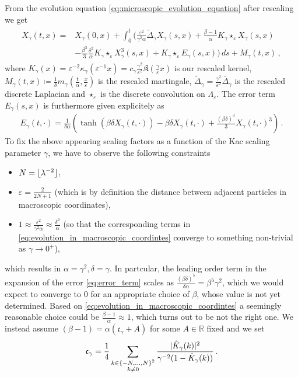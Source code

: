 \documentclass{report}
\newcommand{\RR}{\mathbb{R}}
\DeclarePairedDelimiter\abs{\lvert}{\rvert} %
\DeclarePairedDelimiter\floor{\lfloor}{\rfloor}
\newcommand{\Convolve}[3][]{#2 \star_{#1} #3}
\DeclareMathOperator{\DefiningEquality}{\coloneqq}
\theoremstyle{remark}
\theoremstyle{definition}
\let\epsilon\varepsilon
\begin{document}
From the evolution equation \eqref{eq:microscopic_evolution_equation} after rescaling we get
\begin{align}
  \label{eq:evolution_in_macroscopic_coordintes}
  \begin{split}
      X_\gamma(t, x) =& X_\gamma(0, x) + \int_{0}^{t} \biggl(\frac{\epsilon^2}{\gamma^2 \alpha}\tilde{\Delta}_\gamma X_\gamma(s, x) + \frac{\beta - 1}{\alpha} \Convolve[\epsilon]{K_\gamma}{X_\gamma(s, x)}\\
    &-\frac{\beta^3}{3} \frac{\delta^2}{\alpha} \Convolve[\epsilon]{K_\gamma}{X_\gamma^3(s, x)} + \Convolve[\epsilon]{K_\gamma}{E_\gamma(s, x)}\biggr)\,ds + M_\gamma(t, x)\,,
  \end{split}
\end{align}
where $K_\gamma(x) = \epsilon^{-2} \kappa_\gamma(\epsilon^{-1}x) = c_\gamma \frac{\gamma^2}{\epsilon^2}\mathfrak{K}\left(\frac{\gamma}{\epsilon}x\right)$ is our rescaled kernel, $M_\gamma(t, x) \DefiningEquality \frac{1}{\delta}m_\gamma\left(\frac{t}{\alpha},\frac{x}{\epsilon}\right)$ is the rescaled martingale, $\tilde{\Delta}_\gamma = \frac{\gamma^2}{\epsilon^2} \bar{\Delta}_\gamma$ is the rescaled discrete Laplacian and $\Convolve[\epsilon]{}{}$ is the discrete convolution on $\Lambda_\epsilon$. The error term $E_\gamma(s, x)$ is furthermore given explicitely as 
\begin{align}
  \label{eq:error_term}
  E_\gamma(t, \cdot) = \frac{1}{\delta \alpha}\left(\tanh\left(\beta \delta X_\gamma(t, \cdot)\right) - \beta \delta X_\gamma(t, \cdot) + \frac{(\beta \delta)^3}{3} X_\gamma(t, \cdot)^3\right)\,.
\end{align}
To fix the above appearing scaling factors as a function of the Kac scaling parameter $\gamma$, we have to observe the following constraints 
\begin{itemize}
  \item $N = \floor{\lambda^{-2}}$,
  \item  $\epsilon = \frac{2}{2N + 1}$ (which is by definition the distance between adjacent particles in macroscopic coordinates),
  \item $1 \approx \frac{\epsilon^2}{\gamma^2 \alpha} \approx \frac{\delta^2}{\alpha}$ (so that the corresponding terms in \eqref{eq:evolution_in_macroscopic_coordintes} converge to something non-trivial as $\gamma \to 0^+$),
\end{itemize}
which results in $\alpha = \gamma^2, \delta=\gamma$. In partcular, the leading order term in the expansion of the error \eqref{eq:error_term} scales as $\frac{(\beta \delta)^5}{\delta\alpha} = \beta^5 \gamma^2$, which we would expect to converge to $0$ for an appropriate choice of $\beta$, whose value is not yet determined. Based on \eqref{eq:evolution_in_macroscopic_coordintes} a seemingly reasonable choice could be $\frac{\beta - 1}{\alpha} \approx 1$, which turns out to be not the right one. We instead assume $(\beta - 1) = \alpha(\mathfrak{c}_\gamma + A)$ for some $A \in \RR$ fixed and we set \begin{align}
  \label{eq:mathfrak}
  \mathfrak{c}_\gamma = \frac{1}{4}\sum_{\substack{k \in \left\{-N, \ldots, N\right\}^2\\k\neq 0}}\frac{\abs{\hat{K}_\gamma(k)}^2}{\gamma^{-2} (1 - \hat{K}_\gamma(k))}\,.
\end{align}
\end{document}
